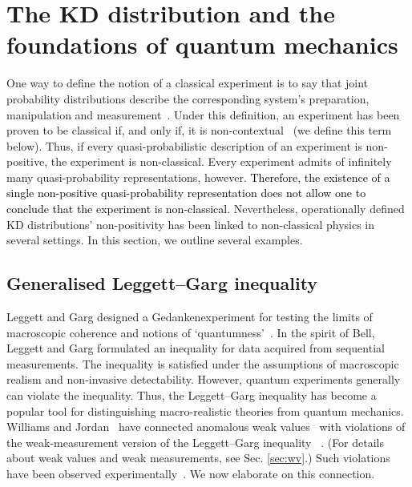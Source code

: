 \documentclass[%
 reprint,
superscriptaddress,
nofootinbib,
bibnotes,
 amsmath,amssymb,
 aps,
]{revtex4-1}
\theoremstyle{plain}
\newcommand{\Dave}[1]{\textcolor{black}{#1} }
\begin{document}
\section{The KD distribution and the foundations of quantum mechanics}
\label{Sec:Foundations}

One way to define the notion of a classical experiment is to say that joint probability distributions describe the corresponding system's preparation, manipulation and measurement~\cite{Dirac26, Dirac26-2, Wigner32,  Dirac45, Cohen66, Hudson74, Srinivas75, Griffiths84, Hartle04, spekkens2008negativity, Allahverdyan15}. Under this definition, an experiment has been proven to be classical if, and only if, it is non-contextual~\cite{spekkens2008negativity} (we define this term below). Thus, if every quasi-probabilistic description of an experiment is non-positive, the experiment is non-classical. Every experiment admits of infinitely many quasi-probability representations, however. 
\Dave{Therefore, the existence of a single non-positive quasi-probability representation does not allow one to conclude that the experiment is non-classical.}
Nevertheless, operationally defined KD distributions' non-positivity has been linked to non-classical physics in several settings. In this section, we outline several examples.



\subsection{Generalised Leggett--Garg inequality}
\label{SubSec:LG}

Leggett and Garg designed a Gedankenexperiment for testing the limits of macroscopic coherence and notions of `quantumness'~\cite{Leggett85}.  In the spirit of Bell, Leggett and Garg formulated an inequality for  data acquired from sequential measurements. The inequality is satisfied under the assumptions of macroscopic realism and non-invasive detectability. However, quantum experiments generally can violate the inequality. Thus, the Leggett--Garg inequality has become a popular tool for distinguishing macro-realistic theories  from quantum mechanics.  Williams and Jordan~\cite{Williams08} have connected anomalous weak values~\cite{Aharanov88} with violations of the weak-measurement version of the Leggett--Garg inequality  ~\cite{PhysRevLett.96.200404,PhysRevLett.97.026805,emary2013leggett}. (For details about weak values and weak measurements, see Sec. \ref{sec:wv}.) 
Such violations have been observed experimentally~\cite{palacios2010experimental,goggin2011violation,knee2012violation,PhysRevLett.111.090506}. 
We now elaborate on this connection.
\end{document}
